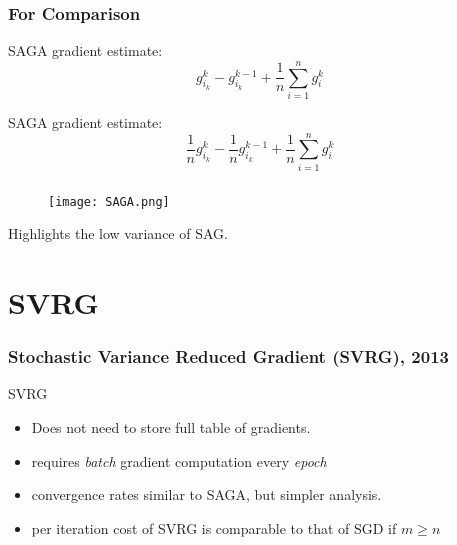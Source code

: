 \documentclass{beamer}
\begin{document}
\begin{frame}
  \frametitle{For Comparison}
  SAGA gradient estimate:
  \begin{equation}
    g_{i_k}^k - g_{i_k}^{k-1} + \frac{1}{n}\sum_{i=1}^{n} g_i^k
  \end{equation}

  SAGA gradient estimate:
  \begin{equation}
    \frac{1}{n}g_{i_k}^k - \frac{1}{n}g_{i_k}^{k-1} + \frac{1}{n}\sum_{i=1}^{n} g_i^k
  \end{equation}

\end{frame}

\begin{frame}
  \frametitle{}

  \begin{figure}[ht]
    \centering
    \texttt{[image: SAGA.png]}
  \end{figure}
  Highlights the low variance of SAG.
\end{frame}


\section{SVRG}%
\label{sec:}

\begin{frame}
  \frametitle{Stochastic Variance Reduced Gradient (SVRG), 2013}

  \begin{algorithm}[H]
    \caption{SVRG}\label{}
    \begin{algorithmic}[1]
      \Endfor{}
      \Endfor{}
    \end{algorithmic}
  \end{algorithm}

  \begin{itemize}
    \item Does not need to store full table of gradients.
    \item requires \emph{batch} gradient computation every \emph{epoch}
    \item convergence rates similar to SAGA, but simpler analysis.
    \item per iteration cost of SVRG is comparable to that of SGD if $m \ge n$
  \end{itemize}

\end{frame}
\end{document}
